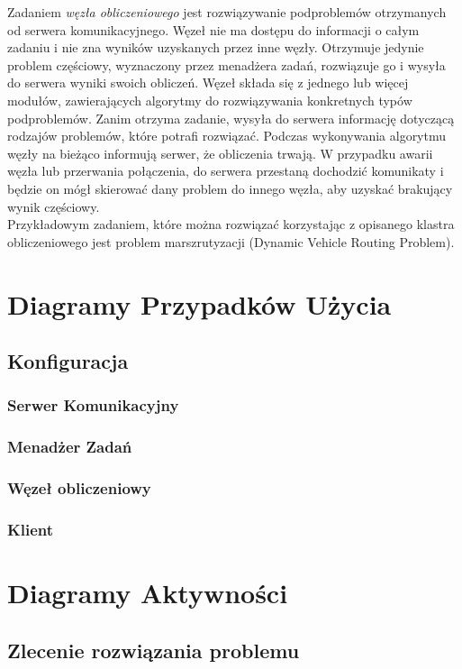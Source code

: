 \documentclass[12pt,a4paper,titlepage]{report}
\begin{document}
Zadaniem \textit{węzła obliczeniowego} jest rozwiązywanie podproblemów otrzymanych od serwera komunikacyjnego. Węzeł nie ma dostępu do informacji o całym zadaniu i nie zna wyników uzyskanych przez inne węzły. Otrzymuje jedynie problem częściowy, wyznaczony przez menadżera zadań, rozwiązuje go i wysyła do serwera wyniki swoich obliczeń. Węzeł składa się z jednego lub więcej modułów, zawierających algorytmy do rozwiązywania konkretnych typów podproblemów. Zanim otrzyma zadanie, wysyła do serwera informację dotyczącą rodzajów problemów, które potrafi rozwiązać. Podczas wykonywania algorytmu węzły na bieżąco informują serwer, że obliczenia trwają. W przypadku awarii węzła lub przerwania połączenia, do serwera przestaną dochodzić komunikaty i będzie on mógł skierować dany problem do innego węzła, aby uzyskać brakujący wynik częściowy.\\
Przykładowym zadaniem, które można rozwiązać korzystając z opisanego klastra obliczeniowego jest problem marszrutyzacji (Dynamic Vehicle Routing Problem).


	\chapter{Diagramy Przypadków Użycia}
		\section{Konfiguracja}
			\subsection{Serwer Komunikacyjny}
			\subsection{Menadżer Zadań}
			\subsection{Węzeł obliczeniowy}
			\subsection{Klient}
			
			
	\chapter{Diagramy Aktywności}
		\section{Zlecenie rozwiązania problemu}
\end{document}
